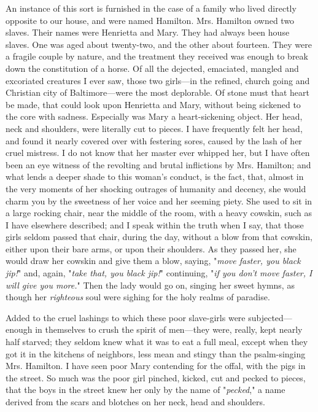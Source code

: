 An instance of this sort is furnished in the case of a family who lived
directly opposite to our house, and were named Hamilton. Mrs. Hamilton
owned two slaves. Their names were Henrietta and Mary. They had always
been house slaves. One was aged about twenty-two, and the other about
fourteen. They were a fragile couple by nature, and the treatment they
received was enough to break down the constitution of a horse. Of all
the dejected, emaciated, mangled and excoriated creatures I ever saw,
those two girls---in the refined, church going and Christian city of
Baltimore---were the most deplorable. Of stone must that heart be made,
that could look upon Henrietta and Mary, without being {}sickened to the
core with sadness. Especially was Mary a heart-sickening object. Her
head, neck and shoulders, were literally cut to pieces. I have
frequently felt her head, and found it nearly covered over with
festering sores, caused by the lash of her cruel mistress. I do not know
that her master ever whipped her, but I have often been an eye witness
of the revolting and brutal inflictions by Mrs. Hamilton; and what lends
a deeper shade to this woman's conduct, is the fact, that, almost in the
very moments of her shocking outrages of humanity and decency, she would
charm you by the sweetness of her voice and her seeming piety. She used
to sit in a large rocking chair, near the middle of the room, with a
heavy cowskin, such as I have elsewhere described; and I speak within
the truth when I say, that those girls seldom passed that chair, during
the day, without a blow from that cowskin, either upon their bare arms,
or upon their shoulders. As they passed her, she would draw her cowskin
and give them a blow, saying, "\emph{move faster, you black jip!}" and,
again, "\emph{take that, you black jip!}" continuing, "\emph{if you
don't move faster, I will give you more.}" Then the lady would go on,
singing her sweet hymns, as though her \emph{righteous} soul were
sighing for the holy realms of paradise.

Added to the cruel lashings to which these poor slave-girls were
subjected---enough in themselves to crush the spirit of men---they were,
really, kept nearly half starved; they seldom knew what it was to eat a
full meal, except when they got it in the kitchens of neighbors, less
mean and stingy than the {}psalm-singing Mrs. Hamilton. I have seen poor
Mary contending for the offal, with the pigs in the street. So much was
the poor girl pinched, kicked, cut and pecked to pieces, that the boys
in the street knew her only by the name of "\emph{pecked}," a name
derived from the scars and blotches on her neck, head and shoulders.

